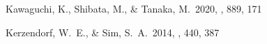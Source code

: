 \documentclass[twocolumn, twocolappendix]{aastex63}
\begin{document}
\begin{thebibliography}{}


















 Kawaguchi, K., Shibata, M., \& Tanaka, M.\ 2020, \apj, 889, 171


 Kerzendorf, W.~E., \& Sim, S.~A.\ 2014, \mnras, 440, 387













\end{thebibliography}
\end{document}
